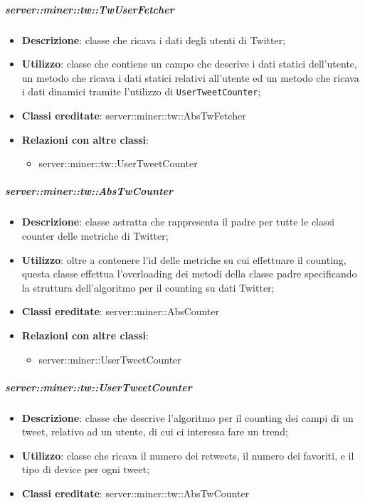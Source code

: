	\subparagraph{server::miner::tw::TwUserFetcher} %
		\label{subp:server_miner_tw_TwUserFetcher}
			\begin{itemize}
				\item \textbf{Descrizione}: classe che ricava i dati degli utenti di Twitter;
				\item \textbf{Utilizzo}: classe che contiene un campo che descrive i dati statici dell'utente, un metodo che ricava i dati statici relativi all'utente ed un metodo che ricava i dati dinamici tramite l'utilizzo di \texttt{UserTweetCounter};
				\item \textbf{Classi ereditate}: server::miner::tw::AbsTwFetcher
				\item \textbf{Relazioni con altre classi}:
					\begin{itemize}
						\item server::miner::tw::UserTweetCounter
					\end{itemize}
			\end{itemize}

	\subparagraph{server::miner::tw::AbsTwCounter} %
		\label{subp:server_miner_tw_AbsTwCounter}
			\begin{itemize}
				\item \textbf{Descrizione}: classe astratta che rappresenta il padre per tutte le classi counter delle metriche di Twitter;
				\item \textbf{Utilizzo}: oltre a contenere l’id delle metriche su cui effettuare il counting, questa classe effettua l'overloading dei metodi della classe padre specificando la struttura dell'algoritmo per il counting su dati Twitter;
				\item \textbf{Classi ereditate}: server::miner::AbsCounter
				\item \textbf{Relazioni con altre classi}:
					\begin{itemize}
						\item server::miner::UserTweetCounter
					\end{itemize}
			\end{itemize}

	\subparagraph{server::miner::tw::UserTweetCounter} %
		\label{subp:server_miner_tw_UserTweetCounter}
			\begin{itemize}
				\item \textbf{Descrizione}: classe che descrive l'algoritmo per il counting dei campi di un tweet, relativo ad un utente, di cui ci interessa fare un trend;
				\item \textbf{Utilizzo}: classe che ricava il numero dei retweets, il numero dei favoriti, e il tipo di device per ogni tweet;
				\item \textbf{Classi ereditate}: server::miner::tw::AbsTwCounter
			\end{itemize}


